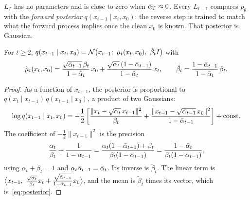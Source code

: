 $L_T$ has no parameters and is close to zero when $\bar\alpha_T \approx 0$.
Every $L_{t-1}$ compares $p_\theta$ with the \emph{forward posterior} $q(x_{t-1} \mid x_t, x_0)$: the reverse step is trained to match what the forward process implies once the clean $x_0$ is known.
That posterior is Gaussian.

\begin{proposition}\label{prop:posterior}
For $t \ge 2$, $q(x_{t-1} \mid x_t, x_0) = \mathcal{N}\!\left(x_{t-1};\ \tilde\mu_t(x_t, x_0),\ \tilde\beta_t I\right)$ with
\begin{equation}\label{eq:posterior}
  \tilde\mu_t(x_t, x_0) = \frac{\sqrt{\bar\alpha_{t-1}}\,\beta_t}{1-\bar\alpha_t}\,x_0 + \frac{\sqrt{\alpha_t}\,(1-\bar\alpha_{t-1})}{1-\bar\alpha_t}\,x_t,
  \qquad
  \tilde\beta_t = \frac{1-\bar\alpha_{t-1}}{1-\bar\alpha_t}\,\beta_t .
\end{equation}
\end{proposition}

\begin{proof}
As a function of $x_{t-1}$, the posterior is proportional to $q(x_t \mid x_{t-1})\, q(x_{t-1} \mid x_0)$, a product of two Gaussians:
\begin{equation*}
  \log q(x_{t-1} \mid x_t, x_0) = -\frac12\left[\frac{\|x_t - \sqrt{\alpha_t}\,x_{t-1}\|^2}{\beta_t} + \frac{\|x_{t-1} - \sqrt{\bar\alpha_{t-1}}\,x_0\|^2}{1-\bar\alpha_{t-1}}\right] + \text{const}.
\end{equation*}
The coefficient of $-\frac12\|x_{t-1}\|^2$ is the precision
\begin{equation*}
  \frac{\alpha_t}{\beta_t} + \frac{1}{1-\bar\alpha_{t-1}} = \frac{\alpha_t(1-\bar\alpha_{t-1}) + \beta_t}{\beta_t(1-\bar\alpha_{t-1})} = \frac{1-\bar\alpha_t}{\beta_t(1-\bar\alpha_{t-1})},
\end{equation*}
using $\alpha_t + \beta_t = 1$ and $\alpha_t \bar\alpha_{t-1} = \bar\alpha_t$. Its inverse is $\tilde\beta_t$.
The linear term is $\big\langle x_{t-1},\ \frac{\sqrt{\alpha_t}}{\beta_t} x_t + \frac{\sqrt{\abar_{t-1}}}{1-\abar_{t-1}} x_0 \big\rangle$, and the mean is $\tilde\beta_t$ times its vector, which is~\eqref{eq:posterior}.
\end{proof}

